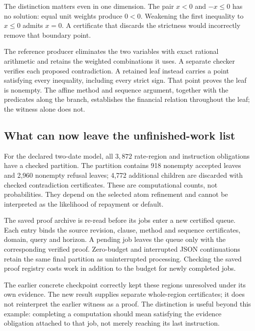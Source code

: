 The distinction matters even in one dimension. The pair $x<0$ and $-x\leq0$ has no solution: equal unit weights produce $0<0$. Weakening the first inequality to $x\leq0$ admits $x=0$. A certificate that discards the strictness would incorrectly remove that boundary point.

The reference producer eliminates the two variables with exact rational arithmetic and retains the weighted combinations it uses. A separate checker verifies each proposed contradiction. A retained leaf instead carries a point satisfying every inequality, including every strict sign. That point proves the leaf is nonempty. The affine method and sequence argument, together with the predicates along the branch, establishes the financial relation throughout the leaf; the witness alone does not.

\subsection{What can now leave the unfinished-work list}

For the declared two-date model, all $3{,}872$ rate-region and instruction obligations have a checked partition. The partition contains 918 nonempty accepted leaves and 2,960 nonempty refusal leaves; 4,772 additional children are discarded with checked contradiction certificates. These are computational counts, not probabilities. They depend on the selected atom refinement and cannot be interpreted as the likelihood of repayment or default.

The saved proof archive is re-read before its jobs enter a new certified queue. Each entry binds the source revision, clause, method and sequence certificates, domain, query and horizon. A pending job leaves the queue only with the corresponding verified proof. Zero-budget and interrupted JSON continuations retain the same final partition as uninterrupted processing. Checking the saved proof registry costs work in addition to the budget for newly completed jobs.

The earlier concrete checkpoint correctly kept these regions unresolved under its own evidence. The new result supplies separate whole-region certificates; it does not reinterpret the earlier witness as a proof. The distinction is useful beyond this example: completing a computation should mean satisfying the evidence obligation attached to that job, not merely reaching its last instruction.


